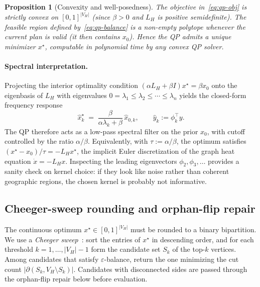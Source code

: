 \documentclass[11pt]{article}
\newtheorem{proposition}{Proposition}[section]
\begin{document}
\begin{proposition}[Convexity and well-posedness]\label{prop:convex}
The objective in~\eqref{eq:qp-obj} is strictly convex on
$[0,1]^{|V_H|}$ (since $\beta > 0$ and $L_H$ is positive semidefinite).
The feasible region defined by~\eqref{eq:qp-balance} is a non-empty
polytope whenever the current plan is valid (it then contains $x_0$).
Hence the QP admits a unique minimizer $x^\star$, computable in
polynomial time by any convex QP solver.
\end{proposition}

\paragraph{Spectral interpretation.} Projecting the interior optimality
condition $(\alpha L_H + \beta I) x^\star = \beta x_0$ onto the
eigenbasis of $L_H$ with eigenvalues
$0 = \lambda_1 \le \lambda_2 \le \cdots \le \lambda_n$ yields the
closed-form frequency response
\begin{equation}\label{eq:freq-response}
  \hat x^\star_k \;=\; \frac{\beta}{\alpha \lambda_k + \beta}\,
  \hat x_{0,k},
  \qquad \hat y_k := \phi_k^\top y.
\end{equation}
The QP therefore acts as a low-pass spectral filter on the prior $x_0$,
with cutoff controlled by the ratio $\alpha / \beta$. Equivalently, with
$\tau := \alpha / \beta$, the optimum satisfies
$(x^\star - x_0)/\tau = -L_H x^\star$, the implicit Euler
discretization of the graph heat equation $\dot x = -L_H x$. Inspecting
the leading eigenvectors $\phi_2, \phi_3, \ldots$ provides a sanity
check on kernel choice: if they look like noise rather than coherent
geographic regions, the chosen kernel is probably not informative.

\subsection{Cheeger-sweep rounding and orphan-flip repair}\label{sec:rounding}

The continuous optimum $x^\star \in [0,1]^{|V_H|}$ must be rounded to a
binary bipartition. We use a \emph{Cheeger sweep}~\cite{kelner2009spectral}:
sort the entries of $x^\star$ in descending order, and for each
threshold $k = 1, \ldots, |V_H| - 1$ form the candidate set $S_k$ of the
top-$k$ vertices. Among candidates that satisfy $\varepsilon$-balance,
return the one minimizing the cut count
$|\partial(S_k, V_H \setminus S_k)|$. Candidates with disconnected sides
are passed through the orphan-flip repair below before evaluation.
\end{document}
